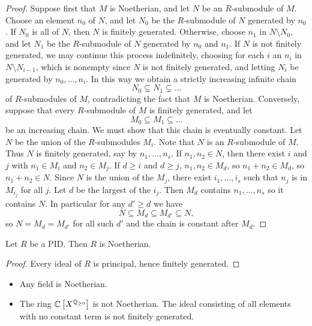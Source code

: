 \begin{proof}
Suppose first that $ M $ is Noetherian, and let $ N $ be an $ R $-submodule of $ M $. Choose an element $ n_0 $ of $ N $, and let $ N_0 $ be the $ R $-submodule of $ N $ generated by $ n_0 $. If $ N_0 $ is all of $ N $, then $ N $ is finitely generated. Otherwise, choose $ n_1 $ in $ N \setminus N_0 $, and let $ N_1 $ be the $ R $-submodule of $ N $ generated by $ n_0 $ and $ n_1 $. If $ N $ is not finitely generated, we may continue this process indefinitely, choosing for each $ i $ an $ n_i $ in $ N \setminus N_{i - 1} $, which is nonempty since $ N $ is not finitely generated, and letting $ N_i $ be generated by $ n_0, \dots, n_i $. In this way we obtain a strictly increasing infinite chain
$$ N_0 \subsetneq N_1 \subsetneq \dots $$
of $ R $-submodules of $ M $, contradicting the fact that $ M $ is Noetherian. Conversely, suppose that every $ R $-submodule of $ M $ is finitely generated, and let
$$ M_0 \subseteq M_1 \subseteq \dots $$
be an increasing chain. We must show that this chain is eventually constant. Let $ N $ be the union of the $ R $-submodules $ M_i $. Note that $ N $ is an $ R $-submodule of $ M $. Thus $ N $ is finitely generated, say by $ n_1, \dots, n_s $. If $ n_1, n_2 \in N $, then there exist $ i $ and $ j $ with $ n_1 \in M_i $ and $ n_2 \in M_j $. If $ d \ge i $ and $ d \ge j $, $ n_1, n_2 \in M_d $, so $ n_1 + n_2 \in M_d $, so $ n_1 + n_2 \in N $. Since $ N $ is the union of the $ M_j $, there exist $ i_1, \dots, i_s $ such that $ n_j $ is in $ M_{i_j} $ for all $ j $. Let $ d $ be the largest of the $ i_j $. Then $ M_d $ contains $ n_1, \dots, n_s $ so it contains $ N $. In particular for any $ d' \ge d $ we have
$$ N \subseteq M_d \subseteq M_{d'} \subseteq N, $$
so $ N = M_d = M_{d'} $ for all such $ d' $ and the chain is constant after $ M_d $.
\end{proof}


\begin{corollary}
Let $ R $ be a PID. Then $ R $ is Noetherian.
\end{corollary}

\begin{proof}
Every ideal of $ R $ is principal, hence finitely generated.
\end{proof}

\begin{example*}
\hfill
\begin{itemize}
\item Any field is Noetherian.
\item The ring $ \C\sbr{X^{\Q_{\ge 0}}} $ is not Noetherian. The ideal consisting of all elements with no constant term is not finitely generated.
\end{itemize}
\end{example*}

